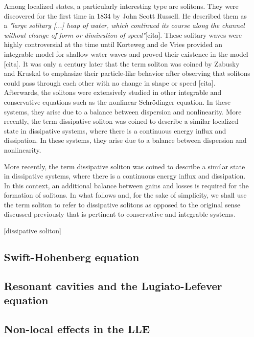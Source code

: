 Among localized states, a particularly interesting type are solitons. They were discovered
 for the first time in 1834 by John Scott Russell. He described them 
 as a {\em "large solitary [...] heap of water, which continued its course along the channel without change of form
or diminution of speed"}[cita]. These solitary waves were highly controversial
at the time until Korteweg and de Vries provided an integrable model for shallow water waves
and proved their existence in the model [cita].
It was only a century later that the term soliton was coined by Zabusky and Kruskal
to emphasize their particle-like behavior after observing that solitons could pass through each
other with no change in shape or speed [cita]. Afterwards, the solitons were extensively studied
in other integrable and conservative equations such as the nonlinear Schrödinger
equation. In these systems, they arise due to a balance between dispersion and nonlinearity. 
More recently, the term dissipative soliton was coined to describe a similar localized state
in dissipative systems, where there is a continuous energy influx and dissipation. 
In these systems, they arise due to a balance between dispersion and nonlinearity. 


More recently, the term dissipative soliton was coined to describe a similar state
in dissipative systems, where there is a continuous energy influx and dissipation. 
In this context, an additional balance between gains and losses is required for the formation
of solitons. In what follows and, for the sake of simplicity, we shall use the term soliton
to refer to dissipative solitons as opposed to the original sense discussed previously
that is pertinent to conservative and integrable systems.



[dissipative soliton]

\subsection{Swift-Hohenberg equation}

\subsection{Resonant cavities and the Lugiato-Lefever equation}

\subsection{Non-local effects in the LLE}
